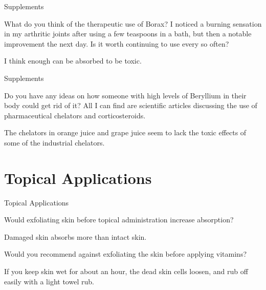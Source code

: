 \documentclass[11pt,oneside,openany,extrafontsizes]{memoir}
\begin{document}
\begin{qaexchange}{Supplements}

    \begin{question}
        What do you think of the therapeutic use of Borax? I noticed a burning sensation in my arthritic joints after using a few teaspoons in a bath, but then a notable improvement the next day. Is it worth continuing to use every so often?
    \end{question}

    \begin{answer}
        I think enough can be absorbed to be toxic.
    \end{answer}
\end{qaexchange}

\begin{qaexchange}{Supplements}

    \begin{question}
        Do you have any ideas on how someone with high levels of Beryllium in their body could get rid of it? All I can find are scientific articles discussing the use of pharmaceutical chelators and corticosteroids.
    \end{question}

    \begin{answer}
        The chelators in orange juice and grape juice seem to lack the toxic effects of some of the industrial chelators.
    \end{answer}
\end{qaexchange}

\section{Topical Applications}

\begin{emailexchange}{Topical Applications}

    \begin{question}
        Would exfoliating skin before topical administration increase absorption?
    \end{question}

    \begin{answer}
      Damaged skin absorbs more than intact skin.
    \end{answer}

    \begin{question}
        Would you recommend against exfoliating the skin before applying vitamins?
    \end{question}

    \begin{answer}
      If you keep skin wet for about an hour, the dead skin cells loosen, and rub off easily with a light towel rub.
    \end{answer}
\end{emailexchange}
\end{document}
